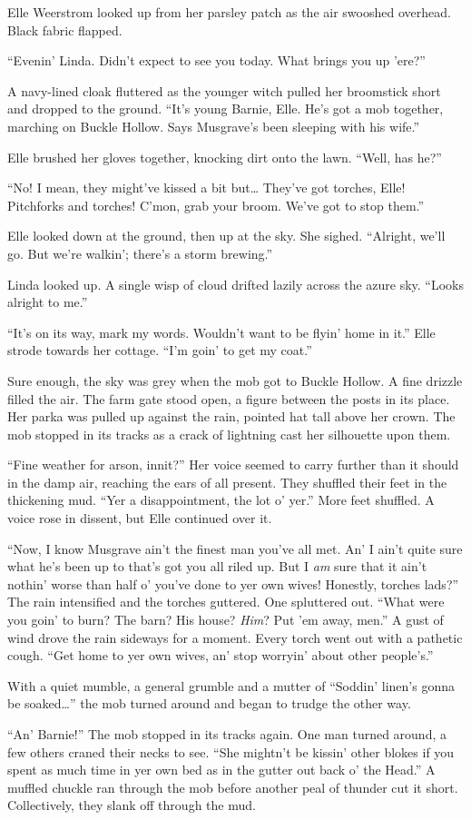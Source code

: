 Elle Weerstrom looked up from her parsley patch as the air swooshed overhead.
Black fabric flapped.

``Evenin' Linda.
Didn't expect to see you today.
What brings you up 'ere?''

A navy-lined cloak fluttered as the younger witch pulled her broomstick short and dropped to the ground.
``It's young Barnie, Elle.
He's got a mob together, marching on Buckle Hollow.
Says Musgrave's been sleeping with his wife.''

Elle brushed her gloves together, knocking dirt onto the lawn.
``Well, has he?''

``No!
I mean, they might've kissed a bit but{\dots}
They've got torches, Elle!
Pitchforks and torches!
C'mon, grab your broom.
We've got to stop them.''

Elle looked down at the ground, then up at the sky.
She sighed.
``Alright, we'll go.
But we're walkin'; there's a storm brewing.''

Linda looked up.
A single wisp of cloud drifted lazily across the azure sky.
``Looks alright to me.''

``It's on its way, mark my words.
Wouldn't want to be flyin' home in it.''
Elle strode towards her cottage.
``I'm goin' to get my coat.''

\storybreak

Sure enough, the sky was grey when the mob got to Buckle Hollow.
A fine drizzle filled the air.
The farm gate stood open, a figure between the posts in its place.
Her parka was pulled up against the rain, pointed hat tall above her crown.
The mob stopped in its tracks as a crack of lightning cast her silhouette upon them.

``Fine weather for arson, innit?''
Her voice seemed to carry further than it should in the damp air, reaching the ears of all present.
They shuffled their feet in the thickening mud.
``Yer a disappointment, the lot o' yer.''
More feet shuffled.
A voice rose in dissent, but Elle continued over it.

``Now, I know Musgrave ain't the finest man you've all met.
An' I ain't quite sure what he's been up to that's got you all riled up.
But I \emph{am} sure that it ain't nothin' worse than half o' you've done to yer own wives!
Honestly, torches lads?''
The rain intensified and the torches guttered.
One spluttered out.
``What were you goin' to burn?
The barn?
His house?
\emph{Him}?
Put 'em away, men.''
A gust of wind drove the rain sideways for a moment.
Every torch went out with a pathetic cough.
``Get home to yer own wives, an' stop worryin' about other people's.''

With a quiet mumble, a general grumble and a mutter of ``Soddin' linen's gonna be soaked\dots'' the mob turned around and began to trudge the other way.

``An' Barnie!''
The mob stopped in its tracks again.
One man turned around, a few others craned their necks to see.
``She mightn't be kissin' other blokes if you spent as much time in yer own bed as in the gutter out back o' the Head.''
A muffled chuckle ran through the mob before another peal of thunder cut it short.
Collectively, they slank off through the mud.
